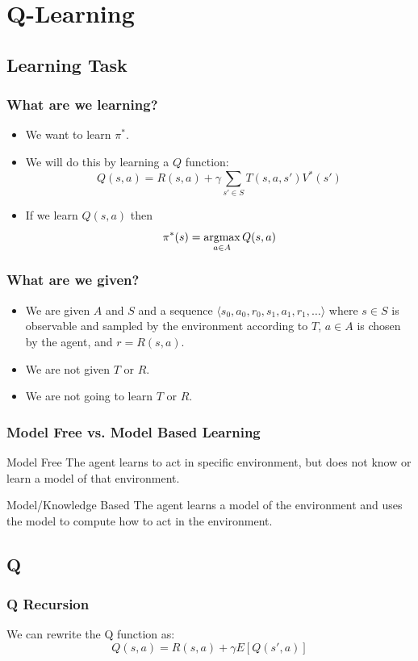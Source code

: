 \documentclass[ignorenonframetext]{beamer}
\newcommand{\argmax}{\operatornamewithlimits{argmax}}
\begin{document}
\section{Q-Learning}
\subsection{Learning Task}
\begin{frame}
	\frametitle{What are we learning?}
	\begin{itemize}
		\item We want to learn $\pi^*$.
			\pause
		\item We will do this by learning a $Q$ function:
			\[
			Q(s,a) = R(s,a) + \gamma \sum_{s' \in S}T(s,a, s') V^*(s')
			\]
			\pause
		\item If we learn $Q(s,a)$ then 
			\[
			\pi^*(s) = \argmax_{a\in A} Q(s,a)
			\]
	\end{itemize}
\end{frame}

\begin{frame}
	\frametitle{What are we given?}
	\begin{itemize}
		\item We are given $A$ and $S$ and a sequence 
			$\langle s_0,a_0,r_0,s_1,a_1,r_1,\dots \rangle$
			where $s \in S$ is observable and sampled by the environment
			according to $T$, $a\in A$ is chosen by the agent, and $r =
			R(s,a)$.
			\pause
		\item We are not given $T$ or $R$.
			\pause
		\item We are not going to learn $T$ or $R$.
	\end{itemize}
\end{frame}

\begin{frame}
	\frametitle{Model Free vs. Model Based Learning}
	\begin{block}{Model Free}
		The agent learns to act in specific environment, but does not
		know or learn a model of that environment.
	\end{block}
	\begin{block}{Model/Knowledge Based}
		The agent learns a model of the environment and uses the model to
		compute how to act in the environment.
	\end{block}
\end{frame}

\subsection{Q}
\begin{frame}
	\frametitle{Q Recursion}
	We can rewrite the Q function as:
	\[
	Q(s,a) = R(s,a) + \gamma E[Q(s',a)]
	\]
\end{frame}
\end{document}
